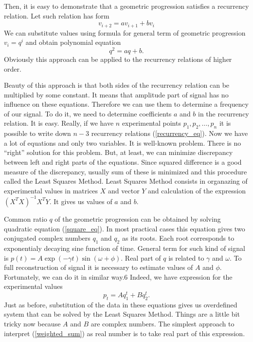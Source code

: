 \documentclass[14pt]{extarticle}
\begin{document}
Then, it is easy to demonstrate that a geometric progression satisfies a recurrency relation.
%
Let such relation has form 
\begin{equation}
 v_{i+2} = a v_{i+1} + b v_{i}
 \label{recurrency_eq}
\end{equation} 
%
We can substitute values using
formula for general term of geometric progression \(v_i = q^i\) and obtain polynomial equation
\begin{equation}
q^2 = a q + b.
\label{square_eq}
\end{equation}
%
Obviously this approach can be applied to the recurrency relations of
higher order.

\newpage
Beauty of this approach is that both sides of the recurrency relation can be multiplied by some
constant. 
%
It means that amplitude part of signal has no influence on these equations.
%
Therefore we can use them to determine a frequency of our signal.
%
To do it, we need to determine coefficients \(a\) and \(b\) in the recurrency relation.
%
It is easy.
%
Really, if we have \(n\) experimental points \(p_1, p_2, \ldots, p_n\) it is possible to write  
down \(n-3\) recurrency relations (\ref{recurrency_eq}).
%
Now we have a lot of equations and only two variables. 
%
It is well-known problem. 
%
There is no ``right'' solution for this problem.
%
But, at least, we can minimize discrepancy between left and right
parts of the equations.
%
Since squared difference is a good measure of the discrepancy, usually
sum of these is minimized and this procedure called the Least Squares Method.
%
Least Squares Method consists in organazing of experimental values in matrices \(X\) and vector \(Y\)
and calculation of the expression \((X^T X)^{-1}X^T Y\).
%
It gives us values of \(a\) and \(b\).

Common ratio \(q\) of the geometric progression can be obtained by solving quadratic
equation (\ref{square_eq}).
%
In most practical cases this equation gives two conjugated complex numbers \(q_1\) and \(q_2\) as its roots.
%
Each root corresponds to exponentialy decaying sine function of time.
%
General term for such kind of signal is \(p(t) = A \exp (-\gamma t) \sin (\omega + \phi)\).
%
Real part of \(q\) is related to \(\gamma\) and \(\omega\).
To full reconstruction of signal it is necessary to estimate values of \(A\) and
\(\phi\).
%
Fortunately, we can do it in similar way.6
%
Indeed, we have expression for the experimental values
\begin{equation}
    p_t = A q_1^t + B q_2^t.
    \label{weighted_sum}
\end{equation}
%
Just as before, substitution of the data in these equations gives us overdefined system
that can be solved by the Least Squares Method.
%
Things are a little bit tricky now because \(A\) and \(B\) are complex numbers.
%
The simplest approach to interpret (\ref{weighted_sum}) as real number is to take
real part of this expression.
%
\end{document}
